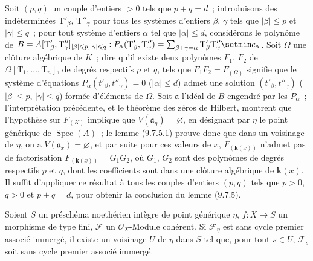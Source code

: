 
Soit $(p,q)$ un couple d'entiers $>0$ tels que $p+q=d$~; introduisons des
indéterminées $\mathrm T'_\beta$, $\mathrm T''_\gamma$ pour tous les systèmes
d'entiers $\beta$, $\gamma$ tels que $|\beta|\leqslant p$ et
$|\gamma|\leqslant q$~; pour tout système d'entiers $\alpha$ tel que
$|\alpha|\leqslant d$, considérons le polynôme de
$B=A[\mathrm T'_\beta,\mathrm T''_\gamma]_{|\beta|\leqslant p,
  |\gamma|\leqslant q}:
P_\alpha(\mathrm T'_\beta,\mathrm T''_\gamma)
=\sum_{\beta+\gamma=\alpha}\mathrm T'_\beta\mathrm T''_\gamma\setmin c_\alpha$.
Soit $\Omega$ une clôture algébrique de $K$~; dire qu'il existe deux polynômes
$F_1$, $F_2$ de $\Omega[\mathrm T_1,\ldots,\mathrm T_n]$, de degrés respectifs
$p$ et $q$, tels que $F_1F_2=F_{(\Omega)}$ signifie que le système d'équations
$P_\alpha(t'_\beta,t''_\gamma)=0$ ($|\alpha|\leqslant d$) admet une solution
$(t'_\beta,t''_\gamma)$ ($|\beta|\leqslant p$, $|\gamma|\leqslant q$) formée
d'éléments de $\Omega$. Soit $\mathfrak a$ l'idéal de $B$ engendré par les
$P_\alpha$~; l'interprétation précédente, et le théorème des zéros de Hilbert,
montrent que l'hypothèse sur $F_{(K)}$ implique que
$V(\mathfrak a_\eta)=\varnothing$, en désignant par $\eta$ le point générique de
$\operatorname{Spec}(A)$~; le lemme (9.7.5.1) prouve donc que dans un voisinage
de $\eta$, on a $V(\mathfrak a_x)=\varnothing$, et par suite pour ces valeurs de $x$,
$F_{(\mathbf{k}(x))}$ n'admet pas de factorisation
$F_{(\mathbf{k}(x))}=G_1G_2$, où $G_1$, $G_2$ sont des polynômes de degrés
respectifs $p$ et $q$, dont les coefficients sont dans une clôture algébrique
de $\boldsymbol{k}(x)$. Il suffit d'appliquer ce résultat à tous les couples
d'entiers $(p,q)$ tels que $p>0$, $q>0$ et $p+q=d$, pour obtenir la conclusion
du lemme (9.7.5).

\begin{proposition}[9.7.6]
\label{IV.9.7.6-fr}
Soient $S$ un préschéma noethérien intègre de point générique $\eta$, $f:X\to S$
un morphisme de type fini, $\mathcal F$ un $\mathcal O_X$-Module cohérent. Si
$\mathcal F_\eta$ est sans cycle premier associé immergé, il existe un voisinage
$U$ de $\eta$ dans $S$ tel que, pour tout $s\in U$, $\mathcal F_s$ soit sans cycle
premier associé immergé.
\end{proposition}

